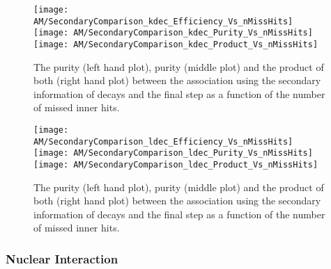 \begin{figure}[!ht]
  \centering
  \texttt{[image: AM/SecondaryComparison\_kdec\_Efficiency\_Vs\_nMissHits]}
  \texttt{[image: AM/SecondaryComparison\_kdec\_Purity\_Vs\_nMissHits]}
  \texttt{[image: AM/SecondaryComparison\_kdec\_Product\_Vs\_nMissHits]}
  \caption[Efficiency, purity and their product for the association with \PKzS{} decays vs final association as a function of missed inner hits]{The purity (left hand plot), purity (middle plot) and the product of both (right hand plot) between the association using the secondary information of \PKzS{} decays and the final step as a function of the number of missed inner hits.\label{plot:AMWFSVkdecEffAndPurVsFA}}
\end{figure}
\begin{figure}[!ht]
  \centering
  \texttt{[image: AM/SecondaryComparison\_ldec\_Efficiency\_Vs\_nMissHits]}
  \texttt{[image: AM/SecondaryComparison\_ldec\_Purity\_Vs\_nMissHits]}
  \texttt{[image: AM/SecondaryComparison\_ldec\_Product\_Vs\_nMissHits]}
  \caption[Efficiency, purity and their product for the association with \PgL{} decays vs final association as a function of missed inner hits]{The purity (left hand plot), purity (middle plot) and the product of both (right hand plot) between the association using the secondary information of \PgL{} decays and the final step as a function of the number of missed inner hits.\label{plot:AMWFSVldecEffAndPurVsFA}}
\end{figure}

\subsubsection{Nuclear Interaction \label{sec:AMWFSVni}}

